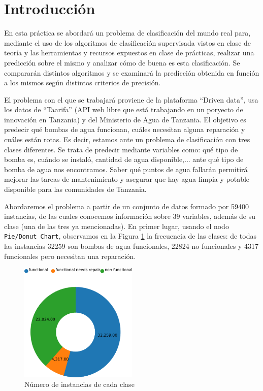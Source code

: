 \documentclass[a4paper, 20pt]{article}
\begin{document}
\section{Introducción}

En esta práctica se abordará un problema de clasificación del mundo real para, mediante el uso de los algoritmos de clasificación supervisada vistos en clase de teoría y las herramientas y recursos expuestos en clase de prácticas, realizar una predicción sobre el mismo y analizar cómo de buena es esta clasificación. Se compararán distintos algoritmos y se examinará la predicción obtenida en función a los mismos según distintos criterios de precisión.

El problema con el que se trabajará proviene de la plataforma ``Driven data'', usa los datos de ``Taarifa'' (API web libre que está trabajando en un poryecto de innovación en Tanzania) y del Ministerio de Agua de Tanzania. El objetivo es predecir qué bombas de agua funcionan, cuáles necesitan alguna reparación y cuáles están rotas. Es decir, estamos ante un problema de clasificación con tres clases diferentes. Se trata de predecir mediante variables como: qué tipo de bomba es, cuándo se instaló, cantidad de agua disponible,... ante qué tipo de bomba de agua nos encontramos. Saber qué puntos de agua fallarán permitirá mejorar las tareas de mantenimiento y asegurar que hay agua limpia y potable disponible para las comunidades de Tanzania.

Abordaremos el problema a partir de un conjunto de datos formado por 59400 instancias, de las cuales conocemos información sobre 39 variables, además de su clase (una de las tres ya mencionadas).
En primer lugar, usando el nodo \texttt{Pie/Donut Chart}, observamos en la Figura \ref{fig:clases1} la frecuencia de las clases: de todas las instancias 32259 son bombas de agua funcionales, 22824 no funcionales y 4317 funcionales pero necesitan una reparación.

\begin{figure}[H]
    \centering
    \includegraphics[width=0.5\textwidth]{chart1}
    \caption{Número de instancias de cada clase}
    \label{fig:clases1}
\end{figure}
\end{document}
